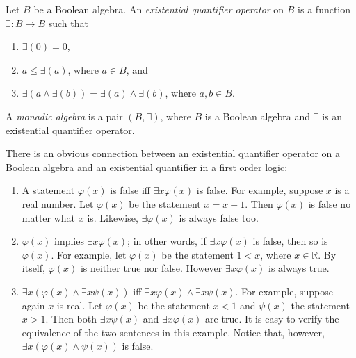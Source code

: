 \documentclass[12pt]{article}
\begin{document}
Let $B$ be a Boolean algebra.  An \emph{existential quantifier operator} on $B$ is a function $\exists: B\to B$ such that
\begin{enumerate}
\item $\exists(0)=0$,
\item $a\le \exists(a)$, where $a\in B$, and
\item $\exists(a\wedge \exists(b))=\exists(a)\wedge \exists(b)$, where $a,b\in B$.
\end{enumerate}
A \emph{monadic algebra} is a pair $(B,\exists)$, where $B$ is a Boolean algebra and $\exists$ is an existential quantifier operator.

There is an obvious connection between an existential quantifier operator on a Boolean algebra and an existential quantifier in a first order logic:
\begin{enumerate}
\item A statement $\varphi(x)$ is false iff $\exists x \varphi(x)$ is false.  For example, suppose $x$ is a real number.  Let $\varphi(x)$ be the statement $x=x+1$.  Then $\varphi(x)$ is false no matter what $x$ is.  Likewise, $\exists \varphi(x)$ is always false too.
\item $\varphi(x)$ implies $\exists x\varphi(x)$; in other words, if $\exists x\varphi(x)$ is false, then so is $\varphi(x)$.  For example, let $\varphi(x)$ be the statement $1<x$, where $x\in \mathbb{R}$.  By itself, $\varphi(x)$ is neither true nor false.  However $\exists x\varphi(x)$ is always true.
\item $\exists x (\varphi(x) \wedge \exists x \psi(x))$ iff $\exists x \varphi(x) \wedge \exists x \psi(x)$.  For example, suppose again $x$ is real.  Let $\varphi(x)$ be the statement $x<1$ and $\psi(x)$ the statement $x>1$.  Then both $\exists x \psi(x)$ and $\exists x \varphi(x)$ are true.  It is easy to verify the equivalence of the two sentences in this example.  Notice that, however, $\exists x (\varphi(x) \wedge \psi(x))$ is false.
\end{enumerate}
\end{document}
